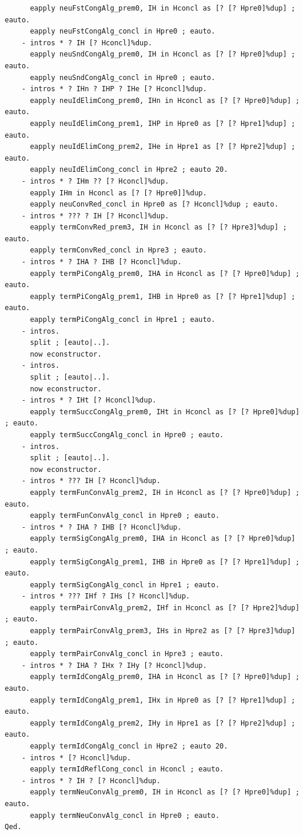 \begin{lstlisting}
      eapply neuFstCongAlg_prem0, IH in Hconcl as [? [? Hpre0]%dup] ; eauto.
      eapply neuFstCongAlg_concl in Hpre0 ; eauto.
    - intros * ? IH [? Hconcl]%dup.
      eapply neuSndCongAlg_prem0, IH in Hconcl as [? [? Hpre0]%dup] ; eauto.
      eapply neuSndCongAlg_concl in Hpre0 ; eauto.
    - intros * ? IHn ? IHP ? IHe [? Hconcl]%dup.
      eapply neuIdElimCong_prem0, IHn in Hconcl as [? [? Hpre0]%dup] ; eauto.
      eapply neuIdElimCong_prem1, IHP in Hpre0 as [? [? Hpre1]%dup] ; eauto.
      eapply neuIdElimCong_prem2, IHe in Hpre1 as [? [? Hpre2]%dup] ; eauto.
      eapply neuIdElimCong_concl in Hpre2 ; eauto 20.
    - intros * ? IHm ?? [? Hconcl]%dup.
      eapply IHm in Hconcl as [? [? Hpre0]]%dup.
      eapply neuConvRed_concl in Hpre0 as [? Hconcl]%dup ; eauto.
    - intros * ??? ? IH [? Hconcl]%dup.
      eapply termConvRed_prem3, IH in Hconcl as [? [? Hpre3]%dup] ; eauto.
      eapply termConvRed_concl in Hpre3 ; eauto.
    - intros * ? IHA ? IHB [? Hconcl]%dup.
      eapply termPiCongAlg_prem0, IHA in Hconcl as [? [? Hpre0]%dup] ; eauto.
      eapply termPiCongAlg_prem1, IHB in Hpre0 as [? [? Hpre1]%dup] ; eauto.
      eapply termPiCongAlg_concl in Hpre1 ; eauto.
    - intros.
      split ; [eauto|..].
      now econstructor.
    - intros.
      split ; [eauto|..].
      now econstructor.
    - intros * ? IHt [? Hconcl]%dup.
      eapply termSuccCongAlg_prem0, IHt in Hconcl as [? [? Hpre0]%dup] ; eauto.
      eapply termSuccCongAlg_concl in Hpre0 ; eauto.
    - intros.
      split ; [eauto|..].
      now econstructor. 
    - intros * ??? IH [? Hconcl]%dup.
      eapply termFunConvAlg_prem2, IH in Hconcl as [? [? Hpre0]%dup] ; eauto.
      eapply termFunConvAlg_concl in Hpre0 ; eauto.
    - intros * ? IHA ? IHB [? Hconcl]%dup.
      eapply termSigCongAlg_prem0, IHA in Hconcl as [? [? Hpre0]%dup] ; eauto.
      eapply termSigCongAlg_prem1, IHB in Hpre0 as [? [? Hpre1]%dup] ; eauto.
      eapply termSigCongAlg_concl in Hpre1 ; eauto.
    - intros * ??? IHf ? IHs [? Hconcl]%dup.
      eapply termPairConvAlg_prem2, IHf in Hconcl as [? [? Hpre2]%dup] ; eauto.
      eapply termPairConvAlg_prem3, IHs in Hpre2 as [? [? Hpre3]%dup] ; eauto.
      eapply termPairConvAlg_concl in Hpre3 ; eauto.
    - intros * ? IHA ? IHx ? IHy [? Hconcl]%dup.
      eapply termIdCongAlg_prem0, IHA in Hconcl as [? [? Hpre0]%dup] ; eauto.
      eapply termIdCongAlg_prem1, IHx in Hpre0 as [? [? Hpre1]%dup] ; eauto.
      eapply termIdCongAlg_prem2, IHy in Hpre1 as [? [? Hpre2]%dup] ; eauto.
      eapply termIdCongAlg_concl in Hpre2 ; eauto 20.
    - intros * [? Hconcl]%dup.
      eapply termIdReflCong_concl in Hconcl ; eauto.
    - intros * ? IH ? [? Hconcl]%dup.
      eapply termNeuConvAlg_prem0, IH in Hconcl as [? [? Hpre0]%dup] ; eauto.
      eapply termNeuConvAlg_concl in Hpre0 ; eauto.
Qed.


\end{lstlisting}
